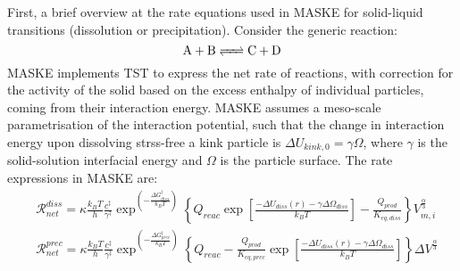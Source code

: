\documentclass[12pt]{paper}    %
\newcommand{\RR}{\mathscr{R}}
\begin{document}
First, a brief overview at the rate equations used in MASKE for solid-liquid transitions (dissolution or precipitation). Consider the generic reaction: 
%
\begin{equation}
\ce{A + B <=> C + D}
\end{equation}
%
MASKE implements TST to express the net rate of reactions, with correction for the activity of the solid based on the excess enthalpy of individual particles, coming from their interaction energy. MASKE assumes a meso-scale parametrisation of the interaction potential, such that the change in interaction energy upon dissolving strss-free a kink particle is $\Delta U_{kink,0} = \gamma \Omega$, where $\gamma$ is the solid-solution interfacial energy and $\Omega$ is the particle surface. The rate expressions in MASKE are:
%
\begin{align}
&\RR_{net}^{diss} = \kappa \frac{k_B T}{h}\frac{c^\ddag}{\gamma^\ddag}\exp^{\left(-\frac{\Delta G^\ddag_{diss}}{k_BT}\right)}\left\{Q_{reac}\exp\left[\frac{-\Delta U_{diss}(r)-\gamma\Delta\Omega_{diss}}{k_BT}\right]-\frac{Q_{prod}}{K_{eq,diss}}\right\} V_{m,i}^{\frac{\alpha}{3}}    \label{EqRdiss}  \\
%
&\RR_{net}^{prec} = \kappa \frac{k_B T}{h}\frac{c^\ddag}{\gamma^\ddag}\exp^{\left(-\frac{\Delta G^\ddag_{prec}}{k_BT}\right)}\left\{Q_{reac}-\frac{Q_{prod}}{K_{eq,prec}}\exp\left[\frac{-\Delta U_{diss}(r)-\gamma\Delta\Omega_{diss}}{k_BT}\right]\right\} \Delta V^{\frac{\alpha}{3}}    \label{EqRprec}
\end{align}
%
\end{document}
